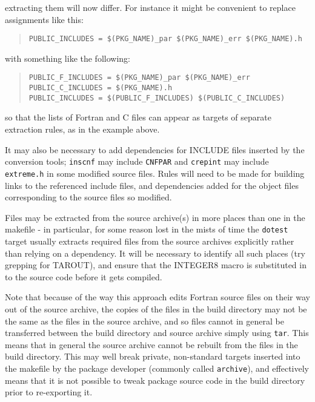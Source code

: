 \documentclass[twoside,11pt]{article}
\newcommand{\htmlref}[2]{#1}
\renewcommand{\_}{\texttt{\symbol{95}}}
\newcommand{\xroutine}[1]{\htmlref{{\tt #1}}{#1}}
\newcommand{\file}[1]{{\tt #1}}
\newenvironment{squote}{\begin{quote}\begin{small}}{\end{small}\end{quote}}
\begin{document}
extracting them will now differ.
For instance it might be convenient to replace assignments like this:
\begin{squote}
\begin{verbatim}
PUBLIC_INCLUDES = $(PKG_NAME)_par $(PKG_NAME)_err $(PKG_NAME).h
\end{verbatim}
\end{squote}
with something like the following:
\begin{squote}
\begin{verbatim}
PUBLIC_F_INCLUDES = $(PKG_NAME)_par $(PKG_NAME)_err
PUBLIC_C_INCLUDES = $(PKG_NAME).h
PUBLIC_INCLUDES = $(PUBLIC_F_INCLUDES) $(PUBLIC_C_INCLUDES)
\end{verbatim}
\end{squote}
so that the lists of Fortran and C files can appear as targets of
separate extraction rules, as in the example above.

It may also be necessary to add dependencies for INCLUDE files inserted
by the conversion tools; \xroutine{inscnf} may include \file{CNF\_PAR}
and \xroutine{crepint} may include \file{extreme.h} 
in some modified source files.  
Rules will need to be made for building links to the referenced
include files, and dependencies added for the object files corresponding
to the source files so modified.

Files may be extracted from the source archive(s) in more places than
one in the makefile - in particular, for some reason lost in the
mists of time the {\tt do\_test} target 
usually extracts required files from the source archives explicitly
rather than relying on a dependency.
It will be necessary to identify all such places 
(try grepping for TAR\_OUT), and ensure that
the INTEGER8 macro is substituted in to the source code before it
gets compiled.

Note that because of the way this approach edits Fortran source files on
their way out of the source archive,
the copies of the files in the build directory may not be the same
as the files in the source archive, and so files cannot in general
be transferred between the build directory and source archive
simply using {\tt tar}.
This means that in general the source archive cannot be rebuilt 
from the files in the build directory.
This may well break private, non-standard targets inserted into the
makefile by the package developer (commonly called {\tt archive}),
and effectively means that it is not possible to tweak package source
code in the build directory prior to re-exporting it.
\end{document}
